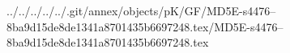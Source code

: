 ../../../../../.git/annex/objects/pK/GF/MD5E-s4476--8ba9d15de8de1341a8701435b6697248.tex/MD5E-s4476--8ba9d15de8de1341a8701435b6697248.tex
